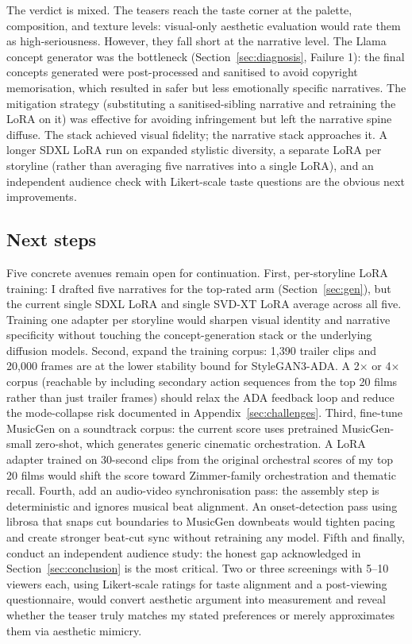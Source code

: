 \documentclass{article}
\begin{document}
The verdict is mixed. The teasers reach the taste corner at the palette, composition, and texture levels: visual-only aesthetic evaluation would rate them as high-seriousness. However, they fall short at the narrative level. The Llama concept generator was the bottleneck (Section~\ref{sec:diagnosis}, Failure 1): the final concepts generated were post-processed and sanitised to avoid copyright memorisation, which resulted in safer but less emotionally specific narratives. The mitigation strategy (substituting a sanitised-sibling narrative and retraining the LoRA on it) was effective for avoiding infringement but left the narrative spine diffuse. The stack achieved visual fidelity; the narrative stack approaches it. A longer SDXL LoRA run on expanded stylistic diversity, a separate LoRA per storyline (rather than averaging five narratives into a single LoRA), and an independent audience check with Likert-scale taste questions are the obvious next improvements.

\subsection{Next steps}

Five concrete avenues remain open for continuation. First, per-storyline LoRA training: I drafted five narratives for the top-rated arm (Section~\ref{sec:gen}), but the current single SDXL LoRA and single SVD-XT LoRA average across all five. Training one adapter per storyline would sharpen visual identity and narrative specificity without touching the concept-generation stack or the underlying diffusion models. Second, expand the training corpus: 1{,}390 trailer clips and 20{,}000 frames are at the lower stability bound for StyleGAN3-ADA. A 2$\times$ or 4$\times$ corpus (reachable by including secondary action sequences from the top 20 films rather than just trailer frames) should relax the ADA feedback loop and reduce the mode-collapse risk documented in Appendix~\ref{sec:challenges}. Third, fine-tune MusicGen on a soundtrack corpus: the current score uses pretrained MusicGen-small zero-shot, which generates generic cinematic orchestration. A LoRA adapter trained on 30-second clips from the original orchestral scores of my top 20 films would shift the score toward Zimmer-family orchestration and thematic recall. Fourth, add an audio-video synchronisation pass: the assembly step is deterministic and ignores musical beat alignment. An onset-detection pass using librosa that snaps cut boundaries to MusicGen downbeats would tighten pacing and create stronger beat-cut sync without retraining any model. Fifth and finally, conduct an independent audience study: the honest gap acknowledged in Section~\ref{sec:conclusion} is the most critical. Two or three screenings with 5–10 viewers each, using Likert-scale ratings for taste alignment and a post-viewing questionnaire, would convert aesthetic argument into measurement and reveal whether the teaser truly matches my stated preferences or merely approximates them via aesthetic mimicry.
\end{document}
